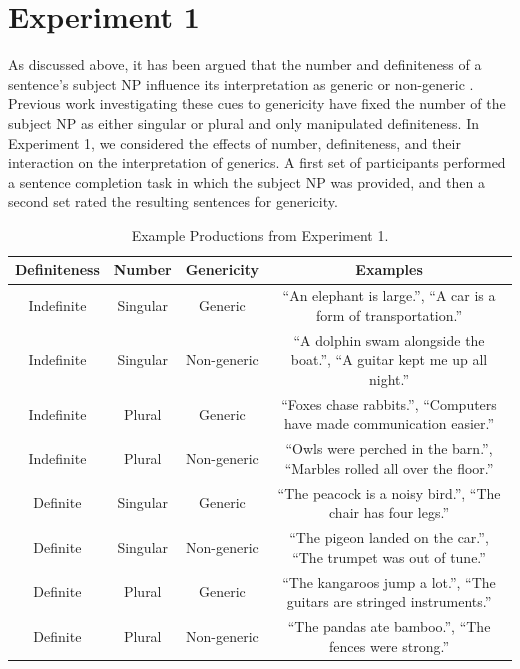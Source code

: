 \documentclass[10pt,letterpaper]{article}
\begin{document}
\section{Experiment 1}

As discussed above, it has been argued that the number and definiteness of a sentence's subject NP influence its interpretation as generic or non-generic \cite{Carlson:1977,Krifka:1995,Lyons:1977}. Previous work investigating these cues to genericity have fixed the number of the subject NP as either singular \cite{Cimpian:2011} or plural \cite{Gelman:2003} and only manipulated definiteness. In Experiment 1, we considered the effects of number, definiteness, and their interaction on the interpretation of generics. A first set of participants performed a sentence completion task in which the subject NP was provided, and then a second set rated the resulting sentences for genericity.

\begin{table}
\begin{center}
\caption{Example Productions from Experiment 1.}
\label{tab:ex}
\vskip 0.12in
\begin{tabular}{cccc}
\hline
Definiteness    &  Number & Genericity & Examples \\
\hline
Indefinite        &   Singular & Generic & ``An elephant is large.'', ``A car is a form of transportation.''\\
Indefinite  &   Singular & Non-generic & ``A dolphin swam alongside the boat.'', ``A guitar kept me up all night.''\\
Indefinite           &   Plural & Generic & ``Foxes chase rabbits.'', ``Computers have made communication easier.''\\
Indefinite         &   Plural  & Non-generic & ``Owls were perched in the barn.'', ``Marbles rolled all over the floor.''\\
Definite        &   Singular & Generic & ``The peacock is a noisy bird.'', ``The chair has four legs.''  \\
Definite  &   Singular & Non-generic & ``The pigeon landed on the car.'', ``The trumpet was out of tune.''\\
Definite           &   Plural & Generic & ``The kangaroos jump a lot.'', ``The guitars are stringed instruments.'' \\
Definite         &   Plural & Non-generic & ``The pandas ate bamboo.'', ``The fences were strong.''\\
\hline
\end{tabular}
\end{center}
\end{table}
\end{document}
